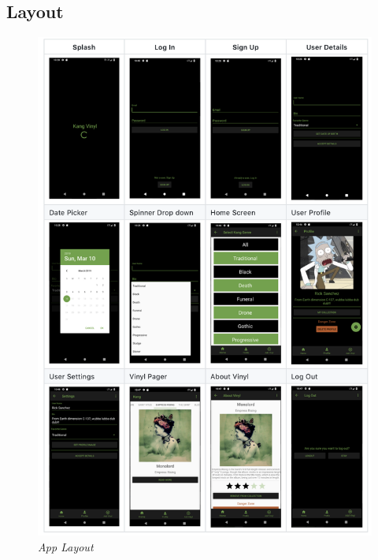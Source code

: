 \clearpage
\subsection{Layout}
\begin{figure}[!ht]
\centering
\includegraphics*[width=0.8
\textwidth]{images/layout.png}
\caption{\em App Layout}
\label{img:layout}
\end{figure}